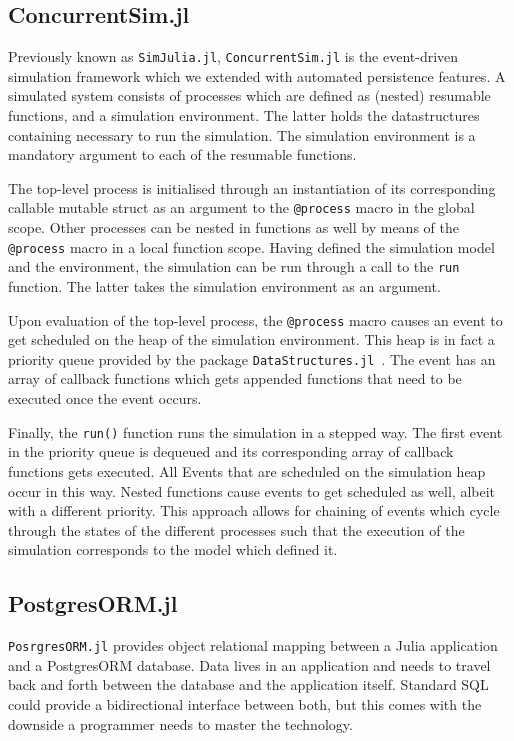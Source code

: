 \documentclass{juliacon}
\begin{document}
\subsection{ConcurrentSim.jl}

Previously known as \texttt{SimJulia.jl}, \texttt{ConcurrentSim.jl}  is the event-driven simulation framework which we extended with automated persistence features. A simulated system consists of processes which are defined as (nested) resumable functions, and a simulation environment. The latter holds the datastructures containing necessary to run the simulation. The simulation environment is a mandatory argument to each of the resumable functions. \vskip 6pt

The top-level process is initialised through an instantiation of its corresponding callable mutable struct as an argument to the \texttt{@process} macro in the global scope. Other processes can be nested in functions as well by means of the \texttt{@process} macro in a local function scope. Having defined the simulation model and the environment, the simulation can be run through a call to the \texttt{run} function. The latter takes the simulation environment as an argument. \vskip 6pt

Upon evaluation of the top-level process, the \texttt{@process} macro causes an event to get scheduled on the heap of the simulation environment. This heap is in fact a priority queue provided by the package \mbox{\texttt{DataStructures.jl} \cite{datastructures}}. The event has an array of callback functions which gets appended functions that need to be executed once the event occurs. \vskip 6pt

Finally, the \texttt{run()} function runs the simulation in a stepped way. The first event in the priority queue is dequeued and its corresponding array of callback functions gets executed. All Events that are scheduled on the simulation heap occur in this way. Nested functions cause events to get scheduled as well, albeit with a different priority. This approach allows for chaining of events which cycle through the states of the different processes such that the execution of the simulation corresponds to the model which defined it. \vskip 6pt

\subsection{PostgresORM.jl}

\texttt{PosrgresORM.jl} provides object relational mapping between a \mbox{Julia} application and a PostgresORM database. Data lives in an application and needs to travel back and forth between the database and the application itself. Standard SQL could provide a bidirectional interface between both, but this comes with the downside a programmer needs to master the technology. \vskip 6pt
\end{document}
